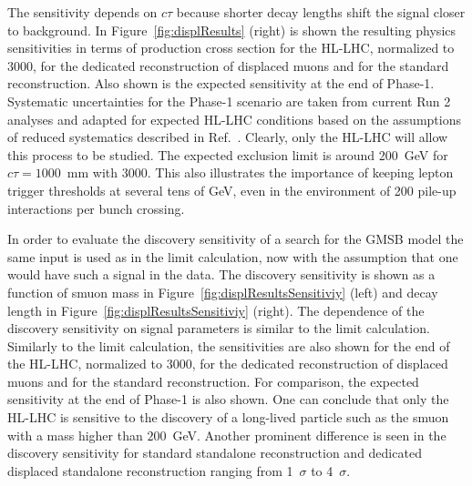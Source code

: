 The sensitivity depends on $c\tau$ because shorter decay lengths shift the signal closer to background. In Figure~\ref{fig:displResults} (right) is shown the resulting physics sensitivities in terms of production cross section for the HL-LHC, normalized to $3000$\fbinv, for the dedicated reconstruction of displaced muons and for the standard reconstruction. Also shown is the expected sensitivity at the end of Phase-1. Systematic uncertainties for the Phase-1 scenario are taken from current Run 2 analyses and adapted for expected HL-LHC conditions based on the assumptions of reduced systematics described in Ref.~\cite{FTR-16-005}. Clearly, only the HL-LHC will allow this process to be studied. The expected exclusion limit is around 200~GeV for $c\tau = 1000$~mm with 3000\fbinv. This also illustrates the importance of keeping lepton trigger thresholds at several tens of GeV, even in the environment of 200 pile-up interactions per bunch crossing.

In order to evaluate the discovery sensitivity of a search for the GMSB model the same input is used as in the limit calculation, now with the assumption that one would have such a signal in the data. The discovery sensitivity is shown as a function of smuon mass in Figure~\ref{fig:displResultsSensitiviy} (left) and decay length in Figure~\ref{fig:displResultsSensitiviy} (right). The dependence of the discovery sensitivity on signal parameters is similar to the limit calculation. Similarly to the limit calculation, the sensitivities are also shown for the end of the HL-LHC, normalized to 3000\fbinv, for the dedicated reconstruction of displaced muons and for the standard reconstruction. For comparison, the expected sensitivity at the end of Phase-1 is also shown. One can conclude that only the HL-LHC is sensitive to the discovery of a long-lived particle such as the smuon with a mass higher than $200$~GeV. Another prominent difference is seen in the discovery sensitivity for standard standalone reconstruction and dedicated displaced standalone reconstruction ranging from 1~$\sigma$ to 4~$\sigma$.


